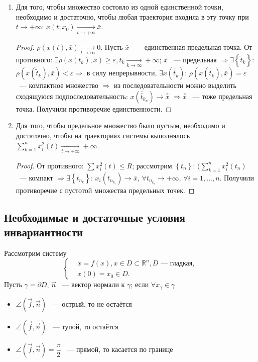\begin{enumerate}
\item Для того, чтобы множество состояло из одной единственной точки, необходимо и достаточно, чтобы любая траектория входила в эту точку при \( t \rightarrow +\infty\): \( x(t; x_0) \xrightarrow[t \rightarrow +\infty]{} \bar{x}. \)
    \begin{proof}
        \( \rho(x(t), \bar{x}) \xrightarrow[t \rightarrow \infty]{} 0 \).
        Пусть \( \bar{x} \) ~--- единственная предельная точка.
        От противного: \( \exists \rho(x(t_k), \bar{x}) \geqslant \varepsilon, t_k \xrightarrow[k \rightarrow \infty]{} +\infty \); \( \bar{x} \) ~--- предельная \( \Rightarrow \exists \left\lbrace \tilde{t}_k \right\rbrace \): \( \rho(x(\tilde{t}_k), \bar{x}) < \varepsilon \Rightarrow \) в силу непрерывности, \( \exists x(\bar{\bar{t}}_k) \): \( \rho (x(\bar{\bar{t}}_k), \bar{x}) = \varepsilon \) ~--- компактное множество \( \Rightarrow \) из последовательности можно выделить сходящуюся подпоследовательность: \( x(\bar{\bar{t}}_{k_n}) \rightarrow \bar{\bar{x}} \) \( \Rightarrow \bar{\bar{x}} \) ~--- тоже предельная точка. Получили противоречие единственности.
    \end{proof}

\item Для того, чтобы предельное множество было пустым, необходимо и достаточно, чтобы на траекториях системы выполнялось \( \sum \limits_{k = 1}^n x_i^2(t) \xrightarrow[t \rightarrow +\infty]{} +\infty \).
     \begin{proof}
         От противного: \( \sum \limits x_i^2(t) \leqslant R \); рассмотрим \( \left\lbrace t_n \right\rbrace \): \(( \sum \limits_{k = 1}^n x_i^2(t_n) \) ~--- компакт \( \Rightarrow \exists \left\lbrace t_{n_k} \right\rbrace \): \( x_i(t_{n_{k_i}}) \rightarrow \bar{x} \), \( \forall t_{n_{k_i}} \rightarrow +\infty \), \( \forall i = 1, \ldots, n \).
         Получили противоречие с пустотой множества предельных точек.
     \end{proof}
\end{enumerate}

\subsection{Необходимые и достаточные условия инвариантности}

Рассмотрим систему
\[ \left\lbrace \begin{aligned}
    & \dot{x} = f(x), x \in D \subset \mathbb{R}^n, D \text{~--- гладкая}, \\
    & x(0) = x_0 \in D.
\end{aligned} \right. \]
Пусть \( \gamma = \partial D \), \( \vec{n} \) ~--- вектор нормали к \( \gamma \); если \( \forall x_\gamma \in \gamma \)
\begin{itemize}
\item \( \angle (\vec{f}, \vec{n}) \) ~--- острый, то не остаётся
\item \( \angle (\vec{f}, \vec{n}) \) ~--- тупой, то остаётся
\item \( \angle (\vec{f}, \vec{n}) = \dfrac{\pi}{2} \) ~--- прямой, то касается по границе 
\end{itemize}

